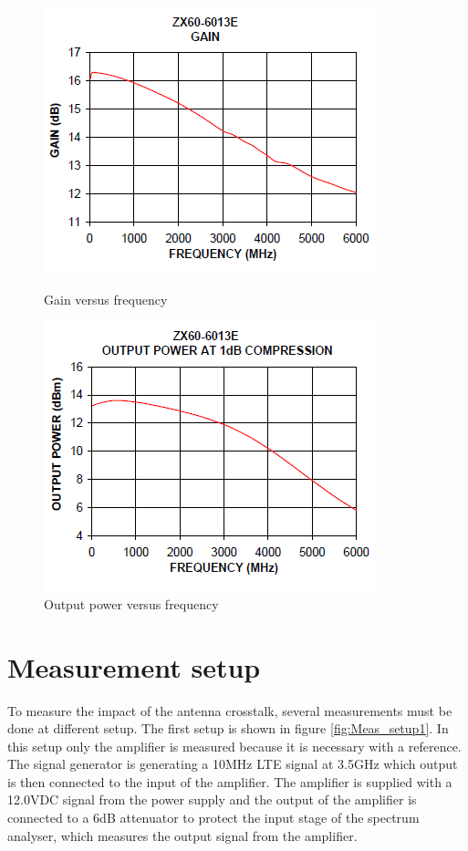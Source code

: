 \begin{figure}[H]
  \centering
  \begin{minipage}[b]{0.5\textwidth}
	\includegraphics[scale = 0.7]{figures/measurement/amp_gain.png}
	\caption{Gain versus frequency}
    \label{fig:amp_gain}
  \end{minipage}
  \hfill
  \begin{minipage}[b]{0.4\textwidth}
\includegraphics[scale = 0.7]{figures/measurement/amp_outpower.png}
\caption{Output power versus frequency}
    \label{fig:amp_outpower}
  \end{minipage}
\end{figure}


\section{Measurement setup} \label{ch_meas_setup}
To measure the impact of the antenna crosstalk, several measurements must be done at different setup. The first setup is shown in figure \ref{fig:Meas_setup1}. In this setup only the amplifier is measured because it is necessary with a reference. The signal generator is generating a 10MHz LTE signal at 3.5GHz which output is then connected to the input of the amplifier. The amplifier is supplied with a 12.0VDC signal from the power supply and the output of the amplifier is connected to a 6dB attenuator to protect the input stage of the spectrum analyser, which measures the output signal from the amplifier.   


